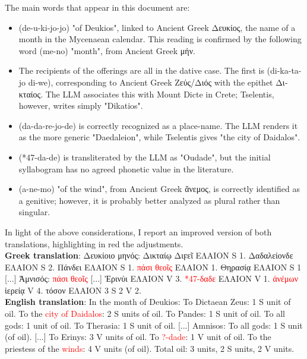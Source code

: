 The main words that appear in this document are:
\begin{itemize}
\item \textlinb{\Bde\Bu\Bki\Bjo\Bjo} (de-u-ki-jo-jo) "of Deukios", linked to Ancient Greek \textgreek{Δευκίος}, the name of a month in the Mycenaean calendar.
This reading is confirmed by the following word \textlinb{\Bme\Bno} (me-no) "month", from Ancient Greek \textgreek{μήν}.
\item The recipients of the offerings are all in the dative case.
The first is \textlinb{\Bdi\Bka\Bta\Bjo} \textlinb{\Bdi\Bwe} (di-ka-ta-jo di-we), corresponding to Ancient Greek \textgreek{Ζεύς/Διός} with the epithet \textgreek{Δικταίος}.
The LLM associates this with Mount Dicte in Crete; Tselentis, however, writes simply "Dikatios".
\item \textlinb{\Bda\Bda\Bre\Bjo\Bde} (da-da-re-jo-de) is correctly recognized as a place-name.
The LLM renders it as the more generic "Daedaleion", while Tselentis gives "the city of Daidalos".
\item \textlinb{\BUvi\Bda\Bde} (*47-da-de) is transliterated by the LLM as "Oudade", but the initial syllabogram has no agreed phonetic value in the literature.
\item \textlinb{\Ba\Bne\Bmo} (a-ne-mo) "of the wind", from Ancient Greek \textgreek{ἄνεμος}, is correctly identified as a genitive; however, it is probably better analyzed as plural rather than singular.
\end{itemize}

In light of the above considerations, I report an improved version of both translations, highlighting in red the adjustments. \\
\textbf{Greek translation}: \textgreek{Δευκίοιο μηνός: Δικταίῳ Διϝεῖ ΕΛΑΙΟΝ S 1. Δαδαλείονδε ΕΛΑΙΟΝ S 2. Πάνδει ΕΛΑΙΟΝ S 1.} \textcolor{red}{\textgreek{πάσι θεοῖς}} \textgreek{ΕΛΑΙΟΝ 1. Θηρασίᾳ ΕΛΑΙΟΝ S 1 [...] Ἀμνισός:} \textcolor{red}{\textgreek{πάσι θεοῖς}} \textgreek{[...] Ἐρινύι ΕΛΑΙΟΝ V 3.} \textcolor{red}{\textgreek{*47-δαδε}} \textgreek{ΕΛΑΙΟΝ V 1.} \textcolor{red}{\textgreek{ἀνέμων}} \textgreek{ἱερείᾳ V 4. τόσον ΕΛΑΙΟΝ 3 S 2 V 2.} \\
\textbf{English translation}: In the month of Deukios: To Dictaean Zeus: 1 S unit of oil. To the \textcolor{red}{city of Daidalos}: 2 S units of oil. To Pandes: 1 S unit of oil. To all gods: 1 unit of oil. To Therasia: 1 S unit of oil. [...] Amnisos: To all gods: 1 S unit (of oil). [...] To Erinys: 3 V units of oil. To \textcolor{red}{?-dade}: 1 V unit of oil. To the priestess of the \textcolor{red}{winds}: 4 V units (of oil). Total oil: 3 units, 2 S units, 2 V units.

